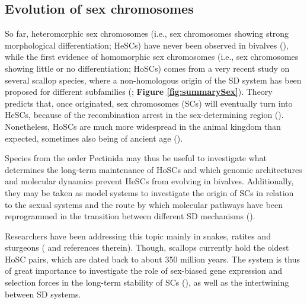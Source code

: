 \documentclass[../main.tex]{subfiles}
\begin{document}
\subsection{Evolution of sex chromosomes}
So far, heteromorphic sex chromosomes (i.e., sex chromosomes showing strong morphological differentiation; HeSCs) have never been observed in bivalves (\textbf{\cite{breton2018sex}}), while the first evidence of homomorphic sex chromosomes (i.e., sex chromosomes showing little or no differentiation; HoSCs) comes from a very recent study on several scallop species, where a non-homologous origin of the SD system has been proposed for different subfamilies (\textbf{\cite{han2022ancient}}; \textbf{Figure \ref{fig:summarySex}}). Theory predicts that, once originated, sex chromosomes (SCs) will eventually turn into HeSCs, because of the recombination arrest in the sex-determining region (\textbf{\cite{bachtrog2014sex, beukeboom2014evolution, han2022ancient}}). Nonetheless, HoSCs are much more widespread in the animal kingdom than expected, sometimes also being of ancient age (\textbf{\cite{bachtrog2014sex, han2022ancient}}).

Species from the order Pectinida may thus be useful to investigate what determines the long-term maintenance of HoSCs and which genomic architectures and molecular dynamics prevent HeSCs from evolving in bivalves. Additionally, they may be taken as model systems to investigate the origin of SCs in relation to the sexual systems and the route by which molecular pathways have been reprogrammed in the transition between different SD mechanisms (\textbf{\cite{han2022ancient}}).

Researchers have been addressing this topic mainly in snakes, ratites and sturgeons (\textbf{\cite{bachtrog2014sex, han2022ancient}} and references therein). Though, scallops currently hold the oldest HoSC pairs, which are dated back to about 350 million years. The system is thus of great importance to investigate the role of sex-biased gene expression and selection forces in the long-term stability of SCs (\textbf{\cite{han2022ancient}}), as well as the intertwining between SD systems.
\end{document}
